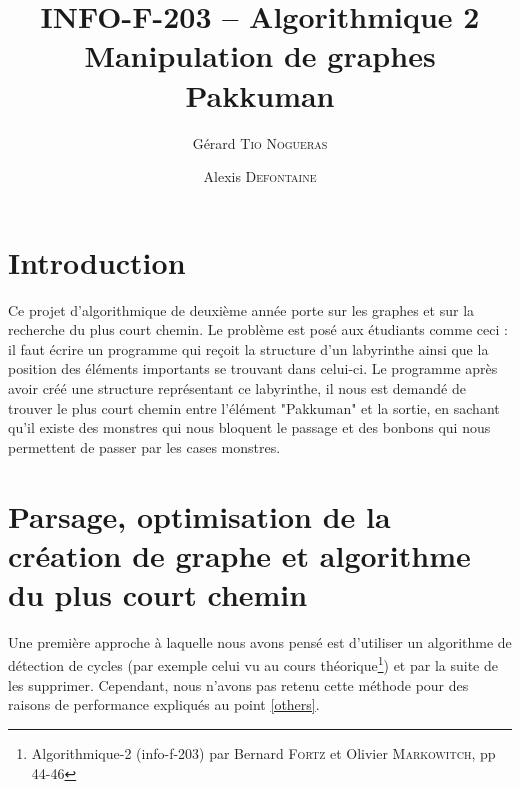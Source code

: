 \documentclass[12pt, oneside]{article}
\title{{\normalsize{INFO-F-203 -- Algorithmique 2}}\\Manipulation de graphes\\ Pakkuman}
\author{Gérard \textsc{Tio Nogueras} \and Alexis \textsc{Defontaine}}
\begin{document}
\maketitle
\section{Introduction}
Ce projet d'algorithmique de deuxième année porte sur les graphes et sur la recherche du plus court chemin.
Le problème est posé aux étudiants comme ceci : il faut écrire un programme qui reçoit la structure d'un labyrinthe ainsi que la position des éléments importants se trouvant dans celui-ci. 
Le programme après avoir créé une structure représentant ce labyrinthe, il nous est demandé de trouver le plus court chemin entre l'élément "Pakkuman" et la sortie, en sachant qu'il existe des monstres qui nous bloquent le passage et des bonbons qui nous permettent de passer par les cases monstres.
\section{Parsage, optimisation de la création de graphe et algorithme du plus court chemin}
Une première approche à laquelle nous avons pensé est d'utiliser un algorithme de détection de cycles (par exemple celui vu au cours théorique\footnote{Algorithmique-2 (info-f-203) par Bernard \textsc{Fortz} et Olivier \textsc{Markowitch}, pp 44-46}) et par la suite de les supprimer. Cependant, nous n'avons pas retenu cette méthode pour des raisons de performance expliqués au point \ref{others}.
\end{document}
